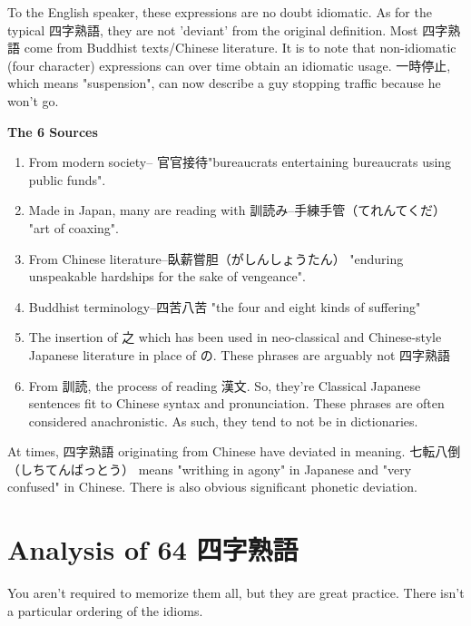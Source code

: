 \par{To the English speaker, these expressions are no doubt idiomatic. As for the typical 四字熟語, they are not 'deviant' from the original definition. Most 四字熟語 come from Buddhist texts\slash Chinese literature. \hfill\break
\hfill\break
It is to note that non-idiomatic (four character) expressions can over time obtain an idiomatic usage. 一時停止, which means "suspension", can now describe a guy stopping traffic because he won't go. }

\begin{center}
\textbf{The 6 Sources }
\end{center}

\begin{enumerate}

\item From modern society-- 官官接待"bureaucrats entertaining bureaucrats using public funds". 
\item Made in Japan, many are reading with 訓読み--手練手管（てれんてくだ） "art of coaxing". \hfill\break

\item From Chinese literature--臥薪嘗胆（がしんしょうたん） "enduring unspeakable hardships for the sake of vengeance". 
\item Buddhist terminology--四苦八苦 "the four and eight kinds of suffering" \hfill\break

\item The insertion of 之 which has been used in neo-classical and Chinese-style Japanese literature in place of の. These phrases are arguably not 四字熟語 
\item From 訓読, the process of reading 漢文. So, they're Classical Japanese sentences fit to Chinese syntax and pronunciation. These phrases are often considered anachronistic. As such, they tend to not be in dictionaries. 
\end{enumerate}

\par{At times, 四字熟語 originating from Chinese have deviated in meaning. 七転八倒（しちてんばっとう） means "writhing in agony" in Japanese and "very confused" in Chinese. There is also obvious significant phonetic deviation. }
      
\section{Analysis of 64 四字熟語}
  
\par{ You aren't required to memorize them all, but they are great practice. There isn't a particular ordering of the idioms. }

